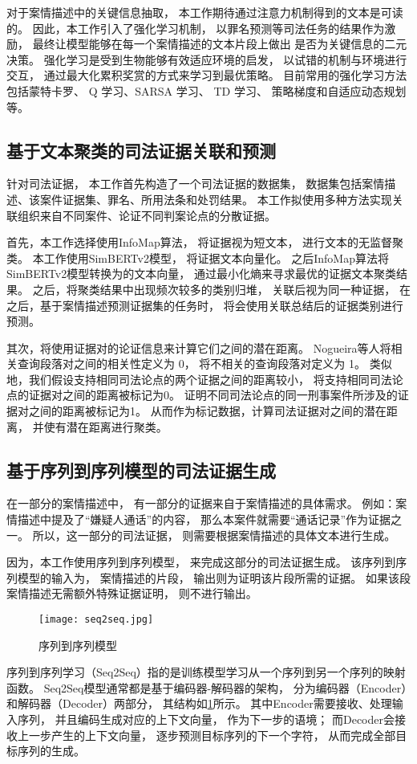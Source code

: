 对于案情描述中的关键信息抽取，
本工作期待通过注意力机制得到的文本是可读的。
因此，本工作引入了强化学习机制，
以罪名预测等司法任务的结果作为激励，
最终让模型能够在每一个案情描述的文本片段上做出
是否为关键信息的二元决策。
强化学习是受到生物能够有效适应环境的启发，
以试错的机制与环境进行交互，
通过最大化累积奖赏的方式来学习到最优策略。
目前常用的强化学习方法包括蒙特卡罗、 
Q 学习、SARSA 学习、 TD 学习、
策略梯度和自适应动态规划等。

\subsection{基于文本聚类的司法证据关联和预测}
针对司法证据，
本工作首先构造了一个司法证据的数据集，
数据集包括案情描述、该案件证据集、罪名、所用法条和处罚结果。
本工作拟使用多种方法实现关联组织来自不同案件、论证不同判案论点的分散证据。

首先，本工作选择使用InfoMap算法，
将证据视为短文本，
进行文本的无监督聚类。
本工作使用SimBERTv2模型，
将证据文本向量化。
之后InfoMap算法将SimBERTv2模型转换为的文本向量，
通过最小化熵来寻求最优的证据文本聚类结果。
之后，将聚类结果中出现频次较多的类别归堆，
关联后视为同一种证据，
在之后，基于案情描述预测证据集的任务时，
将会使用关联总结后的证据类别进行预测。

其次，将使用证据对的论证信息来计算它们之间的潜在距离。
Nogueira等人将相关查询段落对之间的相关性定义为 0，
将不相关的查询段落对定义为 1。
类似地，我们假设支持相同司法论点的两个证据之间的距离较小，
将支持相同司法论点的证据对之间的距离被标记为0。
证明不同司法论点的同一刑事案件所涉及的证据对之间的距离被标记为1。
从而作为标记数据，计算司法证据对之间的潜在距离，
并使有潜在距离进行聚类。

\subsection{基于序列到序列模型的司法证据生成}
在一部分的案情描述中，
有一部分的证据来自于案情描述的具体需求。
例如：案情描述中提及了“嫌疑人通话”的内容，
那么本案件就需要“通话记录”作为证据之一。
所以，这一部分的司法证据，
则需要根据案情描述的具体文本进行生成。

因为，本工作使用序列到序列模型，
来完成这部分的司法证据生成。
该序列到序列模型的输入为，
案情描述的片段，
输出则为证明该片段所需的证据。
如果该段案情描述无需额外特殊证据证明，
则不进行输出。

\begin{figure}[h]
	\centering
	\texttt{[image: seq2seq.jpg]}
	\caption{序列到序列模型}
	\label{seq}
\end{figure}

序列到序列学习（Seq2Seq）指的是训练模型学习从一个序列到另一个序列的映射函数。
Seq2Seq模型通常都是基于编码器-解码器的架构，
分为编码器（Encoder）和解码器（Decoder）两部分，
其结构如\cref{seq}所示。
其中Encoder需要接收、处理输入序列，
并且编码生成对应的上下文向量，
作为下一步的语境；
而Decoder会接收上一步产生的上下文向量，
逐步预测目标序列的下一个字符，
从而完成全部目标序列的生成。
